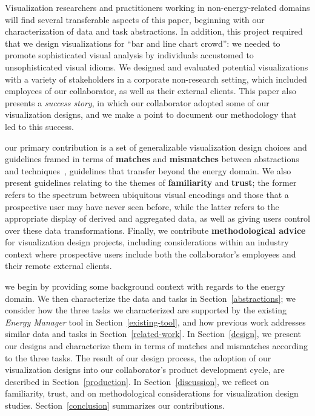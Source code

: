 \documentclass[journal]{vgtc}                %
\newcommand{\bstart}[1]{\vspace{1mm} \noindent{\textbf{#1:}}}
\begin{document}
Visualization researchers and practitioners working in non-energy-related domains will find several transferable aspects of this paper, beginning with our characterization of data and task abstractions.
In addition, this project required that we design visualizations for ``bar and line chart crowd'': we needed to promote sophisticated visual analysis by individuals accustomed to unsophisticated visual idioms.
We designed and evaluated potential visualizations with a variety of stakeholders in a corporate non-research setting, which included employees of our collaborator, as well as their external clients.
This paper also presents a {\it success story}, in which our collaborator adopted some of our visualization designs, and we make a point to document our methodology that led to this success.

\bstart{Contributions} our primary contribution is a set of generalizable visualization design choices and guidelines framed in terms of {\bf matches} and {\bf mismatches} between abstractions and techniques~\cite{Meyer2013}, guidelines that transfer beyond the energy domain.
We also present guidelines relating to the themes of {\bf familiarity} and {\bf trust}; the former refers to the spectrum between ubiquitous visual encodings and those that a prospective user may have never seen before, while the latter refers to the appropriate display of derived and aggregated data, as well as giving users control over these data transformations.
Finally, we contribute {\bf methodological advice} for visualization design projects, including considerations within an industry context where prospective users include both the collaborator's employees and their remote external clients.

\bstart{Outline} we begin by providing some background context with regards to the energy domain.
We then characterize the data and tasks in Section~\ref{abstractions}; we consider how the three tasks we characterized are supported by the existing {\it Energy Manager} tool in Section~\ref{existing-tool}, and how previous work addresses similar data and tasks in Section~\ref{related-work}.
In Section~\ref{design}, we present our designs and characterize them in terms of matches and mismatches according to the three tasks.
The result of our design process, the adoption of our visualization designs into our collaborator's product development cycle, are described in Section~\ref{production}.
In Section~\ref{discussion}, we reflect on familiarity, trust, and on methodological considerations for visualization design studies.
Section~\ref{conclusion} summarizes our contributions.
\end{document}
